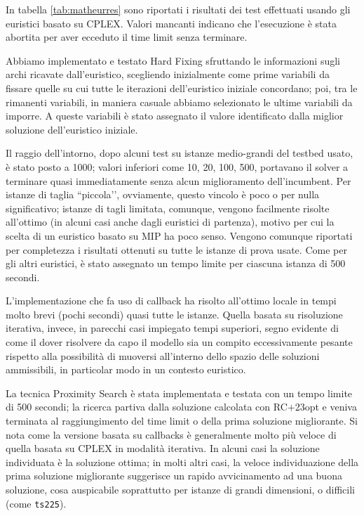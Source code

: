 In tabella \ref{tab:matheurres} sono riportati i risultati dei test effettuati usando gli euristici basato su CPLEX. Valori mancanti indicano che l'esecuzione è stata abortita per aver ecceduto il time limit senza terminare.

Abbiamo implementato e testato Hard Fixing sfruttando le informazioni sugli archi ricavate dall’euristico, scegliendo inizialmente come prime variabili da fissare quelle su cui tutte le iterazioni dell'euristico iniziale concordano; poi, tra le rimanenti variabili, in maniera casuale abbiamo selezionato le ultime variabili da imporre. A queste variabili è stato assegnato il valore identificato dalla miglior soluzione dell’euristico iniziale.

Il raggio dell’intorno, dopo alcuni test su istanze medio-grandi del testbed usato, è stato posto a 1000; valori inferiori come 10, 20, 100, 500, portavano il solver a terminare quasi immediatamente senza alcun miglioramento dell’incumbent. Per istanze di taglia ``piccola’’, ovviamente, questo vincolo è poco o per nulla significativo; istanze di tagli limitata, comunque, vengono facilmente risolte all’ottimo (in alcuni casi anche dagli euristici di partenza), motivo per cui la scelta di un euristico basato su MIP ha poco senso. Vengono comunque riportati per completezza i risultati ottenuti su tutte le istanze di prova usate. Come per gli altri euristici, è stato assegnato un tempo limite per ciascuna istanza di 500 secondi.

L’implementazione che fa uso di callback ha risolto all’ottimo locale in tempi molto brevi (pochi secondi) quasi tutte le istanze. Quella basata su risoluzione iterativa, invece, in parecchi casi impiegato tempi superiori, segno evidente di come il dover risolvere da capo il modello sia un compito eccessivamente pesante rispetto alla possibilità di muoversi all’interno dello spazio delle soluzioni ammissibili, in particolar modo in un contesto euristico.


La tecnica Proximity Search è stata implementata e testata con un tempo limite di 500 secondi; la ricerca partiva dalla soluzione calcolata con RC+23opt e veniva terminata al raggiungimento del time limit o della prima soluzione migliorante. Si nota come la versione basata su callbacks è generalmente molto più veloce di quella basata su CPLEX in modalità iterativa. In alcuni casi la soluzione individuata è la soluzione ottima; in molti altri casi, la veloce individuazione della prima soluzione migliorante suggerisce un rapido avvicinamento ad una buona soluzione, cosa auspicabile soprattutto per istanze di grandi dimensioni, o difficili (come \texttt{ts225}).

